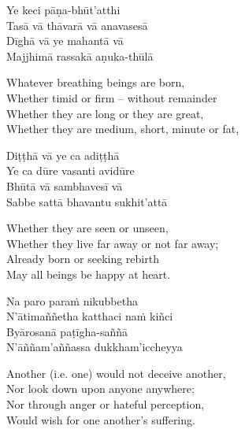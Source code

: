 \begin{pali-hang-continued}
  Ye keci pāṇa-bhūt'atthi\\
  Tasā vā thāvarā vā anavasesā\\
  Dīghā vā ye mahantā vā\\
  Majjhimā rassakā aṇuka-thūlā
\end{pali-hang-continued}

\begin{english-verses}
  Whatever breathing beings are born,\\
  Whether timid or firm – without remainder\\
  Whether they are long or they are great,\\
  Whether they are medium, short, minute or fat,
\end{english-verses}

\begin{pali-hang-continued}
  Diṭṭhā vā ye ca adiṭṭhā\\
  Ye ca dūre vasanti avidūre\\
  Bhūtā vā sambhavesī vā\\
  Sabbe sattā bhavantu sukhit'attā
\end{pali-hang-continued}

\begin{english-verses}
  Whether they are seen or unseen,\\
  Whether they live far away or not far away;\\
  Already born or seeking rebirth\\
  May all beings be happy at heart.
\end{english-verses}

\begin{pali-hang-continued}
  Na paro paraṁ nikubbetha\\
  N'ātimaññetha katthaci naṁ kiñci\\
  Byārosanā paṭīgha-saññā\\
  N'āññam'aññassa dukkham'iccheyya
\end{pali-hang-continued}

\begin{english-verses}
  Another (i.e. one) would not deceive another,\\
  Nor look down upon anyone anywhere;\\
  Nor through anger or hateful perception,\\
  Would wish for one another's suffering.
\end{english-verses}

